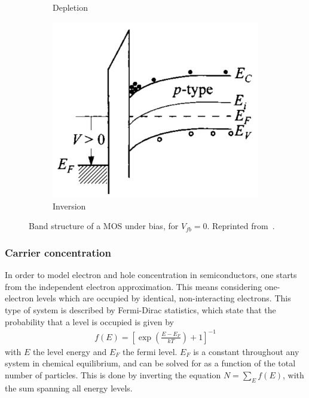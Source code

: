 \begin{figure}[H]
\begin{subfigure}[b]{.3\textwidth}
        \label{fig:mosdesercion}
        \caption{Depletion}
    \end{subfigure}
    \begin{subfigure}[b]{.3\textwidth}
        \includegraphics{figuras/mos/inversion.png}
        \caption{Inversion}
        \label{fig:mosinversion}
    \end{subfigure}
    \caption{Band structure of a MOS under bias, for $V_{fb}=0$.
Reprinted from~\cite{sze_physics_2007}.}
    \label{fig:polarizacionmos}
\end{figure}
%
\subsubsection{Carrier concentration}
In order to model electron and hole concentration in semiconductors,
one starts from the independent electron approximation.
This means considering one-electron levels which are occupied by identical,
non-interacting electrons.
This type of system is described by Fermi-Dirac statistics,
which state that the probability that a level is occupied is given by
\begin{align*}
    f(E) = \left[\exp\left(\frac{E-E_F}{kT}\right)+1\right]^{-1}
\end{align*}
with $E$ the level energy and $E_F$ the fermi level.
$E_F$ is a constant throughout any system in chemical equilibrium,
and can be solved for as a function of the total number of particles.
This is done by inverting the equation $N=\sum_E f(E)$,
with the sum spanning all energy levels.

